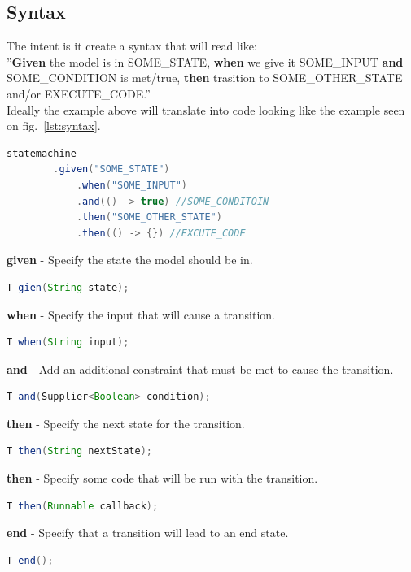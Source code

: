 \documentclass{article}
\begin{document}
\subsection{Syntax}

The intent is it create a syntax that will read like:\\
''\textbf{Given} the model is in SOME\_STATE, \textbf{when} we give it SOME\_INPUT \textbf{and} SOME\_CONDITION is met/true, \textbf{then} trasition to SOME\_OTHER\_STATE  and/or EXECUTE\_CODE.''\\

\noindent Ideally the example above will translate into code looking like the example seen on fig.~\ref{lst:syntax}.
\begin{lstlisting}[language=java, caption={Example of Intented API Usage}, captionpos=b, label={lst:syntax}]
    statemachine
        .given("SOME_STATE")
            .when("SOME_INPUT")
            .and(() -> true) //SOME_CONDITOIN
            .then("SOME_OTHER_STATE")
            .then(() -> {}) //EXCUTE_CODE
\end{lstlisting}

\textbf{given} - Specify the state the model should be in.
\begin{lstlisting}[language=java]
    T gien(String state);
\end{lstlisting}

\textbf{when} - Specify the input that will cause a transition.
\begin{lstlisting}[language=java]
    T when(String input);
\end{lstlisting}

\textbf{and} - Add an additional constraint that must be met to cause the transition.
\begin{lstlisting}[language=java]
    T and(Supplier<Boolean> condition);
\end{lstlisting}

\textbf{then} - Specify the next state for the transition.
\begin{lstlisting}[language=java]
    T then(String nextState);
\end{lstlisting}

\textbf{then} - Specify some code that will be run with the transition.
\begin{lstlisting}[language=java]
    T then(Runnable callback);
\end{lstlisting}

\textbf{end} - Specify that a transition will lead to an end state.
\begin{lstlisting}[language=java]
    T end();
\end{lstlisting}
\end{document}
